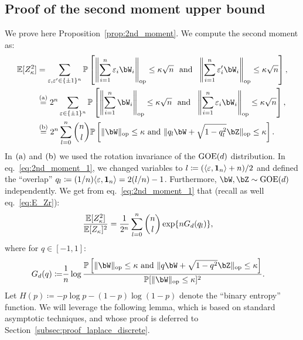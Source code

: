 \subsection{Proof of the second moment upper bound}
\label{subsec:proof_2nd_moment}

We prove here Proposition~\ref{prop:2nd_moment}.
We compute the second moment as: 
\begin{align}\label{eq:2nd_moment_1}
    \nonumber
    \EE[Z_\kappa^2] &= \sum_{\eps, \eps' \in \{\pm 1\}^n} \bbP\left[\left\|\sum_{i=1}^n \eps_i \bW_i\right\|_\op \leq \kappa \sqrt{n} \, \, \textrm{ and } \, \,\left\|\sum_{i=1}^n \eps'_i \bW_i\right\|_\op \leq \kappa \sqrt{n}\right], \\ 
    \nonumber
    &\aeq 2^n \sum_{\eps \in \{\pm 1\}^n} \bbP\left[\left\|\sum_{i=1}^n \bW_i\right\|_\op \leq \kappa \sqrt{n} \, \, \textrm{ and } \, \,\left\|\sum_{i=1}^n \eps_i \bW_i\right\|_\op \leq \kappa \sqrt{n}\right], \\
    &\beq 2^n \sum_{l=0}^n \binom{n}{l} \bbP\left[\|\bW\|_\op \leq \kappa \textrm{ and } \|q_l \bW + \sqrt{1-q_l^2} \bZ\|_\op \leq \kappa\right].
\end{align}
In $(\rm a)$ and $(\rm b)$ we used the rotation invariance of the $\mathrm{GOE}(d)$ distribution. In eq.~\eqref{eq:2nd_moment_1}, 
we changed variables to $l \coloneqq (\langle \varepsilon, \mathbf{1}_n\rangle + n)/2$ and defined the ``overlap'' $q_l \coloneqq (1/n) \langle \varepsilon, \mathbf{1}_n \rangle = 2 (l/n) - 1$.
Furthermore, $\bW, \bZ \sim \GOE(d)$ independently. 
We get from eq.~\eqref{eq:2nd_moment_1} that (recall as well eq.~\eqref{eq:E_Zr}):
\begin{align}\label{eq:2nd_moment_2}
    \frac{\mathbb{E}[Z_\kappa^2]}{\mathbb{E}[Z_\kappa]^2} &= \frac{1}{2^n} \sum_{l=0}^n \binom{n}{l} \exp\{n G_d(q_l)\}, 
\end{align}
where for $q \in [-1,1]$:
\begin{align}\label{eq:def_Gd}
    G_d(q) \coloneqq&  
    \frac{1}{n} \log \frac{\bbP\left[\|\bW\|_\op \leq \kappa \textrm{ and } \|q \bW + \sqrt{1-q^2} \bZ\|_\op \leq \kappa\right]}{\bbP[\|\bW\|_\op \leq \kappa]^2}.
\end{align}
Let $H(p) \coloneqq - p \log p - (1-p)\log (1-p)$ denote the ``binary entropy'' function.
We will leverage the following lemma, which is based on standard asymptotic techniques, 
and whose proof is deferred to Section~\ref{subsec:proof_laplace_discrete}.
